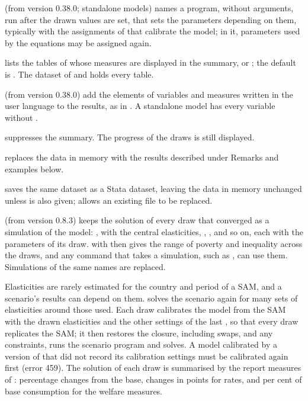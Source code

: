 \begin{optdesc}
\item[\optarg{cal}{ibrate}{program}] (from version 0.38.0; standalone
models) names a program, without arguments, run after the drawn values are
set, that sets the parameters depending on them, typically with the
assignments of  that calibrate the model; in it,
parameters used by the equations may be assigned again.

\item[\optarg{tab}{les}{list}] lists the tables of  whose
measures are displayed in the summary, or ; the default is
. The dataset of  and  holds
every table.

\item[\optarg{vari}{ables}{names}, \optarg{item}{s}{items}] (from version
0.38.0) add the elements of variables and measures written in the user
language to the results, as in . A standalone model has
every variable without .

\item[\opt{nod}{isplay}] suppresses the summary. The progress of the draws is
still displayed.

\item[\opt{}{clear}] replaces the data in memory with the results described
under Remarks and examples below.

\item[\optarg{sav}{ing}{filename\textup{[}\texttt{, replace}\textup{]}}]
saves the same dataset as a Stata dataset, leaving the data in memory
unchanged unless  is also given;  allows an existing
file to be replaced.

\item[\optarg{}{keep}{name}] (from version 0.8.3) keeps the solution of every
draw that converged as a simulation of the model: , with the
central elasticities, , , and so on, each
with the parameters of its draw.  with
\cmd{)} then gives the range of poverty and inequality
across the draws, and any command that takes a simulation, such as
, can use them. Simulations of the same names are
replaced.
\end{optdesc}


Elasticities are rarely estimated for the country and period of a SAM, and a
scenario's results can depend on them.  solves the
scenario again for many sets of elasticities around those used. Each draw
calibrates the model from the SAM with the drawn elasticities and the other
settings of the last , so that every draw replicates
the SAM; it then restores the closure, including swaps, and any constraints,
runs the scenario program and solves. A model calibrated by a version of
\pkg that did not record its calibration settings must be calibrated again
first (error 459). The solution of each draw is
summarised by the report measures of : percentage changes
from the base, changes in points for rates, and per cent of base consumption
for the welfare measures.

